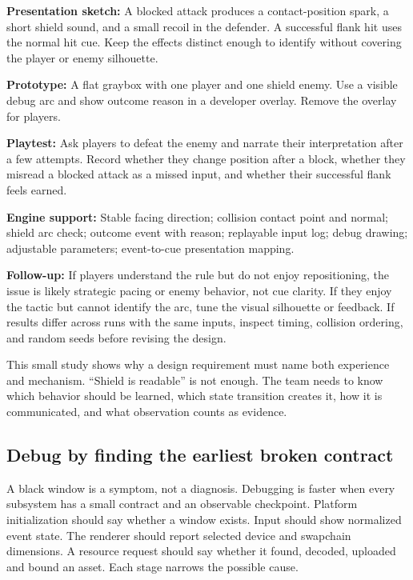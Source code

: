 \textbf{Presentation sketch:} A blocked attack produces a contact-position spark, a short shield sound, and a small recoil in the defender. A successful flank hit uses the normal hit cue. Keep the effects distinct enough to identify without covering the player or enemy silhouette.

\textbf{Prototype:} A flat graybox with one player and one shield enemy. Use a visible debug arc and show outcome reason in a developer overlay. Remove the overlay for players.

\textbf{Playtest:} Ask players to defeat the enemy and narrate their interpretation after a few attempts. Record whether they change position after a block, whether they misread a blocked attack as a missed input, and whether their successful flank feels earned.

\textbf{Engine support:} Stable facing direction; collision contact point and normal; shield arc check; outcome event with reason; replayable input log; debug drawing; adjustable parameters; event-to-cue presentation mapping.

\textbf{Follow-up:} If players understand the rule but do not enjoy repositioning, the issue is likely strategic pacing or enemy behavior, not cue clarity. If they enjoy the tactic but cannot identify the arc, tune the visual silhouette or feedback. If results differ across runs with the same inputs, inspect timing, collision ordering, and random seeds before revising the design.

This small study shows why a design requirement must name both experience and mechanism. ``Shield is readable'' is not enough. The team needs to know which behavior should be learned, which state transition creates it, how it is communicated, and what observation counts as evidence.

\subsection{Debug by finding the earliest broken contract}\label{06-engine-ii-ch041-debug-by-finding-the-earliest-broken-contract}

A black window is a symptom, not a diagnosis. Debugging is faster when every subsystem has a small contract and an observable checkpoint. Platform initialization should say whether a window exists. Input should show normalized event state. The renderer should report selected device and swapchain dimensions. A resource request should say whether it found, decoded, uploaded and bound an asset. Each stage narrows the possible cause.

